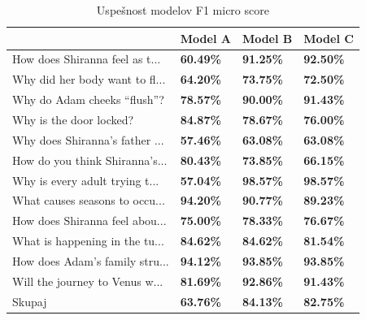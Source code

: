 \documentclass[journal]{IEEEtran}
\begin{document}
\begin{table}[]
	\begin{tabular}{l|l|l|l|}
		\cline{2-4}
		                            & Model A          & Model B          & Model C          \\ \hline


	
	\multicolumn{1}{|l|}{How does Shiranna feel as t...} & \textbf{60.49\%} & \textbf{91.25\%} & \textbf{92.50\%} \\ \hline
	\multicolumn{1}{|l|}{Why did her body want to fl...} & \textbf{64.20\%} & \textbf{73.75\%} & \textbf{72.50\%} \\ \hline
	\multicolumn{1}{|l|}{Why do Adam cheeks “flush”?} & \textbf{78.57\%} & \textbf{90.00\%} & \textbf{91.43\%} \\ \hline
	\multicolumn{1}{|l|}{Why is the door locked?} & \textbf{84.87\%} & \textbf{78.67\%} & \textbf{76.00\%} \\ \hline
	\multicolumn{1}{|l|}{Why does Shiranna’s father ...} & \textbf{57.46\%} & \textbf{63.08\%} & \textbf{63.08\%} \\ \hline
	\multicolumn{1}{|l|}{How do you think Shiranna’s...} & \textbf{80.43\%} & \textbf{73.85\%} & \textbf{66.15\%} \\ \hline
	\multicolumn{1}{|l|}{Why is every adult trying t...} & \textbf{57.04\%} & \textbf{98.57\%} & \textbf{98.57\%} \\ \hline
	\multicolumn{1}{|l|}{What causes seasons to occu...} & \textbf{94.20\%} & \textbf{90.77\%} & \textbf{89.23\%} \\ \hline
	\multicolumn{1}{|l|}{How does Shiranna feel abou...} & \textbf{75.00\%} & \textbf{78.33\%} & \textbf{76.67\%} \\ \hline
	\multicolumn{1}{|l|}{What is happening in the tu...} & \textbf{84.62\%} & \textbf{84.62\%} & \textbf{81.54\%} \\ \hline
	\multicolumn{1}{|l|}{How does Adam’s family stru...} & \textbf{94.12\%} & \textbf{93.85\%} & \textbf{93.85\%} \\ \hline
	\multicolumn{1}{|l|}{Will the journey to Venus w...} & \textbf{81.69\%} & \textbf{92.86\%} & \textbf{91.43\%} \\ \hline
	\multicolumn{1}{|l|}{Skupaj} & \textbf{63.76\%} & \textbf{84.13\%} & \textbf{82.75\%} \\ \hline
		
		
	\end{tabular}
	\caption{Uspešnost modelov F1 micro score}
	\label{t:mod}
\end{table}
\end{document}
